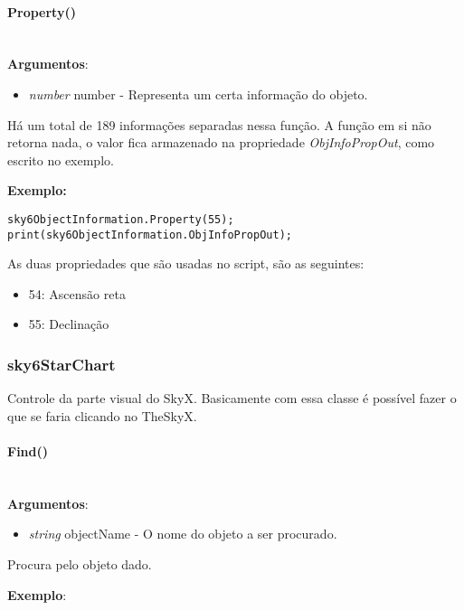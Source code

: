 \documentclass{article}
\begin{document}
\paragraph{Property()}\mbox{}\\

\textbf{Argumentos}:

\begin{itemize}
    \item \emph{number} number - Representa um certa informação do objeto.
\end{itemize}

Há um total de 189 informações separadas nessa função. A função em si não retorna nada, o valor fica armazenado na propriedade \emph{ObjInfoPropOut}, como escrito no exemplo.

\textbf{Exemplo:}

\begin{lstlisting}
sky6ObjectInformation.Property(55);
print(sky6ObjectInformation.ObjInfoPropOut);
\end{lstlisting}

As duas propriedades que são usadas no script, são as seguintes:

\begin{itemize}
    \item 54: Ascensão reta
    \item 55: Declinação
\end{itemize}

\subsubsection{sky6StarChart}

Controle da parte visual do SkyX. Basicamente com essa classe é possível fazer o que se faria clicando no TheSkyX.

\paragraph{Find()}\mbox{}\\

\textbf{Argumentos}:

\begin{itemize}
    \item \emph{string} objectName - O nome do objeto a ser procurado.
\end{itemize}

Procura pelo objeto dado.

\textbf{Exemplo}:
\end{document}
